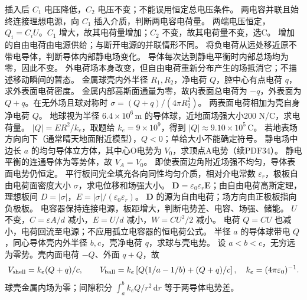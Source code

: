 \crosscheck 插入后 $C_1$ 电压降低，$C_2$ 电压不变；不能误用恒定总电压条件。
\problemtext 两电容并联且始终连接理想电源，向 $C_1$ 插入介质，判断两电容电荷量。
\workings 两端电压恒定，$Q_i=C_iU$。$C_1$ 增大，故其电荷量增加；$C_2$ 不变，故其电荷量不变，选C。
\crosscheck 增加的自由电荷由电源供给；与断开电源的并联情形不同。
\problemtext 将负电荷从远处移近原不带电导体，判断导体内部静电场变化。
\workings 导体每次达到静电平衡时内部总场均为零，因此不变。
\crosscheck 外电荷场本身改变，但自由电荷重新分布产生的场抵消它；不描述移动瞬间的暂态。
\problemtext 金属球壳内外半径 $R_1,R_2$，净电荷 $Q$，腔中心有点电荷 $q$，求外表面电荷密度。
\workings 金属内部高斯面通量为零，故内表面总电荷为 $-q$，外表面为 $Q+q$。在无外场且球对称时 $\sigma=(Q+q)/(4\pi R_2^2)$。
\crosscheck 两表面电荷相加为壳自身净电荷 $Q$。
\problemtext 地球视为半径 $6.4\times10^6\,\mathrm m$ 的导体球，近地面场强大小200 N/C，求电荷量。
\workings $|Q|=ER^2/k_e$，取题给 $k_e=9\times10^9$，得到 $|Q|\approx9.10\times10^5\,\mathrm C$。
\crosscheck 若地表场方向向下（通常晴天地面附近模型），$Q<0$；单给大小不能确定符号。
\problemtext 静电场中边长 $a$ 的均匀导体立方体，其中心O电势为 $V_0$，求顶点A电势（续PDF34）。
\workings 静电平衡的连通导体为等势体，故 $V_A=V_0$。
\crosscheck 即使表面边角附近场强不均匀，导体表面电势仍恒定。
\problemtext 平行板间完全填充各向同性均匀介质，相对介电常数 $\varepsilon_r$，极板自由电荷面密度大小 $\sigma$，求电位移和场强大小。
\workings $\bm D=\varepsilon_0\varepsilon_r\bm E$；由自由电荷高斯定理，理想板间 $D=|\sigma|$，$E=|\sigma|/(\varepsilon_0\varepsilon_r)$。
\crosscheck $\bm D$ 的源为自由电荷；场方向由正极板指向负极板。
\problemtext 电容器保持连接电源，板距增大，判断电势差、电容、场强、储能。
\workings $U$ 不变，$C=\varepsilon A/d$ 减小，$E=U/d$ 减小，$W=CU^2/2$ 减小。
\crosscheck 电荷 $Q=CU$ 也减小，电荷回流至电源；不应用孤立电容器的恒电荷公式。
\problemtext 半径 $a$ 的导体球带电 $Q$，同心导体壳内外半径 $b,c$，壳净电荷 $q$，求球与壳电势。
\workings 设 $a<b<c$，无穷远为零势。壳内面电荷 $-Q$、外面 $q+Q$，故
\[
V_{\rm shell}=k_e(Q+q)/c,\qquad
V_{\rm ball}=k_e\left[Q(1/a-1/b)+(Q+q)/c\right],
\quad k_e=(4\pi\varepsilon_0)^{-1}.
\]
\crosscheck 球壳金属内场为零；间隙积分 $\int_a^b k_eQ/r^2\,\mathrm dr$ 等于两导体电势差。

